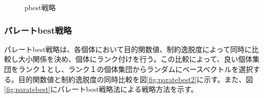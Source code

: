 \documentclass[a4paper,12pt]{jsreport}
\begin{document}
\begin{figure}[htbp]
  \begin{center}
  \hfill
  \end{center}

  \caption{pbest戦略}
  \label{fig:pbest図}
\end{figure}


\subsubsection{パレートbest戦略}
パレートbest戦略は、各個体において目的関数値、制約逸脱度によって同時に比較し大小関係を決め、個体にランク付けを行う。この比較によって、良い個体集団をランク１とし、ランク１の個体集団からランダムにベースベクトルを選択する。目的関数値と制約逸脱度の同時比較を図\ref{fig:paratebest2}に示す。また、図\ref{fig:paratebest}にパレートbest戦略法による戦略方法を示す。
\end{document}
